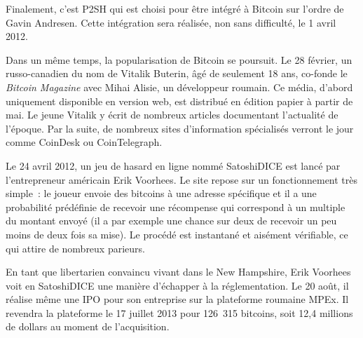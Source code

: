 Finalement, c'est P2SH qui est choisi pour être intégré à Bitcoin sur l'ordre de Gavin Andresen. Cette intégration sera réalisée, non sans difficulté, le 1\ier{} avril 2012.


Dans un même temps, la popularisation de Bitcoin se poursuit. Le 28 février, un russo-canadien du nom de Vitalik Buterin, âgé de seulement 18 ans, co-fonde le \emph{Bitcoin Magazine} avec Mihai Alisie, un développeur roumain. Ce média, d'abord uniquement disponible en version web, est distribué en édition papier à partir de mai. Le jeune Vitalik y écrit de nombreux articles documentant l'actualité de l'époque. Par la suite, de nombreux sites d'information spécialisés verront le jour comme CoinDesk ou CoinTelegraph.

Le 24 avril 2012, un jeu de hasard en ligne nommé SatoshiDICE est lancé par l'entrepreneur américain Erik Voorhees. Le site repose sur un fonctionnement très simple~: le joueur envoie des bitcoins à une adresse spécifique et il a une probabilité prédéfinie de recevoir une récompense qui correspond à un multiple du montant envoyé (il a par exemple une chance sur deux de recevoir un peu moins de deux fois sa mise). Le procédé est instantané et aisément vérifiable, ce qui attire de nombreux parieurs. %


En tant que libertarien convaincu vivant dans le New Hampshire, Erik Voorhees voit en SatoshiDICE une manière d'échapper à la réglementation. Le 20 août, il réalise même une IPO pour son entreprise sur la plateforme roumaine MPEx. Il revendra la plateforme le 17 juillet 2013 pour 126~315 bitcoins, soit 12,4 millions de dollars au moment de l'acquisition.

